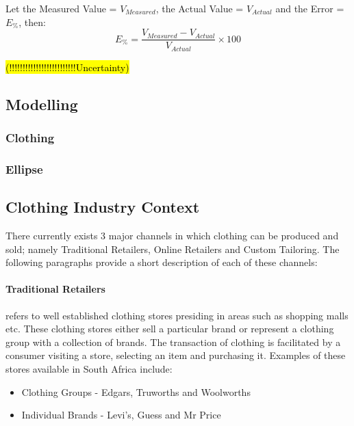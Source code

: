 Let the Measured Value = $V_{Measured}$, the Actual Value = $V_{Actual}$ and the Error = $E_\%$, then:\\
\begin{equation} \label{eq: measurementAcc}
E_\% = \frac{V_{Measured} - V_{Actual}}{V_{Actual}} \times 100
\end{equation} 

\hl{(!!!!!!!!!!!!!!!!!!!!!!!!!Uncertainty)}

\subsection{Modelling}

\subsubsection{Clothing}

\subsubsection{Ellipse}

\subsection{Clothing Industry Context} \label{clothingIndustryContext}

There currently exists 3 major channels in which clothing can be produced and sold; namely Traditional Retailers, Online Retailers and Custom Tailoring. The following paragraphs provide a short description of each of these channels:

\paragraph{Traditional Retailers}
refers to well established clothing stores presiding in areas such as shopping malls etc. These clothing stores either sell a particular brand or represent a clothing group with a collection of brands. The transaction of clothing is facilitated by a consumer visiting a store, selecting an item and purchasing it. Examples of these stores available in South Africa include:

\begin{itemize}
	\item Clothing Groups - Edgars, Truworths and Woolworths
	\item Individual Brands - Levi's, Guess and Mr Price
\end{itemize}

